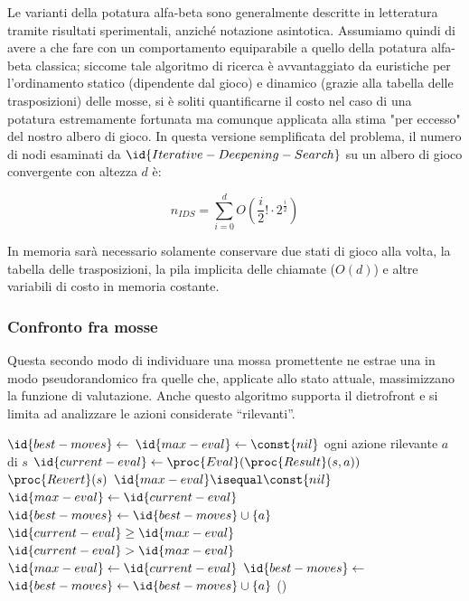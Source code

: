 \documentclass{article}
\begin{document}
Le varianti della potatura alfa-beta sono generalmente descritte in letteratura
tramite risultati sperimentali, anziché notazione asintotica. Assumiamo quindi
di avere a che fare con un comportamento equiparabile a quello della potatura
alfa-beta classica; siccome tale algoritmo di ricerca è avvantaggiato da
euristiche per l'ordinamento statico (dipendente dal gioco) e dinamico (grazie
alla tabella delle trasposizioni) delle mosse, si è soliti quantificarne il
costo nel caso di una potatura estremamente fortunata ma comunque applicata
alla stima "per eccesso" del nostro albero di gioco. In questa versione
semplificata del problema, il numero di nodi esaminati da
$\id{Iterative-Deepening-Search}$ su un albero di gioco convergente con altezza
$d$ è:

\begin{equation}
  n_{IDS} = \sum_{i = 0}^{d} O(\frac{i}{2}! \cdot 2^\frac{i}{2})
\end{equation}

In memoria sarà necessario solamente conservare due stati di gioco alla volta,
la tabella delle trasposizioni, la pila implicita delle chiamate ($O(d)$) e
altre variabili di costo in memoria costante.

\subsubsection{Confronto fra mosse}

Questa secondo modo di individuare una mossa promettente ne estrae una in modo
pseudorandomico fra quelle che, applicate allo stato attuale, massimizzano la
funzione di valutazione. Anche questo algoritmo supporta il dietrofront e si
limita ad analizzare le azioni considerate ``rilevanti''.

\begin{codebox}
  \li  $\id{best-moves} \gets$
       {\emph{}}
  \li  $\id{max-eval} \gets \const{nil}$
  \li \For ogni azione rilevante $a$ di $s$
  \li   \Do
          $\id{current-eval} \gets \proc{Eval}(\proc{Result}(s, a))$
  \li     $\proc{Revert}(s)$
  \li     \If $\id{max-eval} \isequal \const{nil}$
  \li       \Then
              $\id{max-eval} \gets \id{current-eval}$
  \li         $\id{best-moves} \gets \id{best-moves} \cup \{ a \}$
  \li     \ElseIf $\id{current-eval} \geq \id{max-eval}$
  \li       \Then
              \If $\id{current-eval} > \id{max-eval}$
  \li           \Then
                  $\id{max-eval} \gets \id{current-eval}$
  \li             $\id{best-moves} \gets$
                  {\emph{}}
                \End
  \li         $\id{best-moves} \gets \id{best-moves} \cup \{ a \}$
          \End
        \End
  \li  \Return {}()
\end{codebox}
\end{document}
